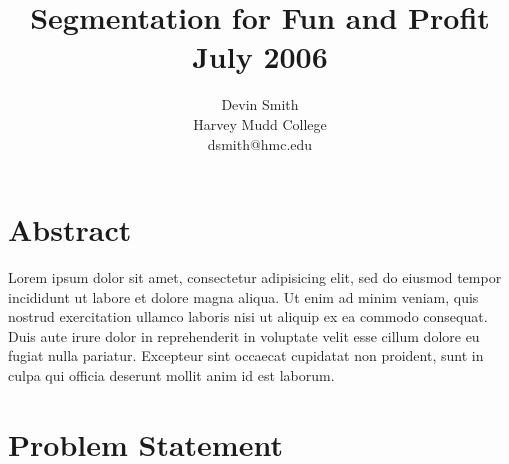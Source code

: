 \documentclass[10pt]{acmsiggraph}               %
\title{Segmentation for Fun and Profit\\
\small{July 2006}}
\author{Devin Smith\\Harvey Mudd College\\dsmith@hmc.edu}%
\begin{document}


\maketitle

\section{Abstract}

Lorem ipsum dolor sit amet, consectetur adipisicing elit, sed do eiusmod tempor incididunt ut labore et dolore magna aliqua. Ut enim ad minim veniam, quis nostrud exercitation ullamco laboris nisi ut aliquip ex ea commodo consequat. Duis aute irure dolor in reprehenderit in voluptate velit esse cillum dolore eu fugiat nulla pariatur. Excepteur sint occaecat cupidatat non proident, sunt in culpa qui officia deserunt mollit anim id est laborum.

\section{Problem Statement}



\end{document}
